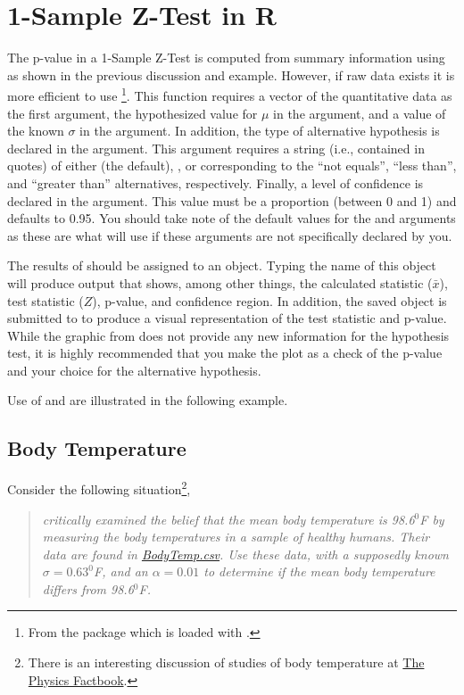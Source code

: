 \documentclass[10pt,openany]{book}\usepackage[]{graphicx}\usepackage[]{color}
\begin{document}
\section{1-Sample Z-Test in R}
The p-value in a 1-Sample Z-Test is computed from summary information using  as shown in the previous discussion and example.  However, if raw data exists it is more efficient to use \footnote{From the  package which is loaded with .}.  This function requires a vector of the quantitative data as the first argument, the hypothesized value for $\mu$ in the  argument, and a value of the known $\sigma$ in the  argument.  In addition, the type of alternative hypothesis is declared in the  argument.  This argument requires a string (i.e., contained in quotes) of either  (the default), , or  corresponding to the ``not equals'', ``less than'', and ``greater than'' alternatives, respectively.  Finally, a level of confidence is declared in the  argument.  This value must be a proportion (between 0 and 1) and defaults to 0.95.  You should take note of the default values for the  and  arguments as these are what  will use if these arguments are not specifically declared by you.

The results of  should be assigned to an object.  Typing the name of this object will produce output that shows, among other things, the calculated statistic ($\bar{x}$), test statistic ($Z$), p-value, and confidence region.  In addition, the saved object is submitted to  to produce a visual representation of the test statistic and p-value.  While the graphic from  does not provide any new information for the hypothesis test, it is highly recommended that you make the plot as a check of the p-value and your choice for the alternative hypothesis.

Use of  and  are illustrated in the following example.

\subsection{Body Temperature}
Consider the following situation\footnote{There is an interesting discussion of studies of body temperature at \href{http://hypertextbook.com/facts/LenaWong.shtml}{The Physics Factbook}.},
\begin{quote}
\textsl{\cite{Machowiaketal1992} critically examined the belief that the mean body temperature is 98.6$^{0}$F by measuring the body temperatures in a sample of healthy humans.  Their data are found in \href{https://raw.githubusercontent.com/droglenc/NCData/master/BodyTemp.csv}{BodyTemp.csv}.  Use these data, with a supposedly known $\sigma=0.63^{0}$F, and an $\alpha=0.01$ to determine if the mean body temperature differs from 98.6$^{0}$F.}
\end{quote}
\end{document}
